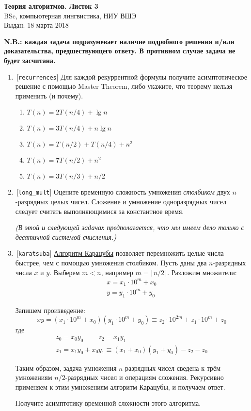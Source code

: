 \documentclass[12pt,a4paper]{report}
\begin{document}
\begin{center}
\textbf{\large{Теория алгоритмов. Листок 3}}\\
BSc, компьютерная лингвистика, НИУ ВШЭ\\
Выдан: 18 марта 2018\\
\end{center}

{\bf N.B.: каждая задача подразумевает наличие подробного решения и/или доказательства, предшествующего ответу. В противном случае задача не будет засчитана.}

\begin{enumerate}
  \item\,[{\tt recurrences}] Для каждой рекуррентной формулы получите асимптотическое решение с помощью Master Theorem, либо укажите, что теорему нельзя применить (и почему).

  \begin{enumerate}
    \item $T(n) = 2T(n/4) + \lg n$
    \item $T(n) = 3T(n/4) + n \lg n$
    \item $T(n) = T(n/2) + T(n/4) + n^2$
    \item $T(n) = 7T(n/2) + n^2$
    \item $T(n) = 3T(n/3) + n/2$
  \end{enumerate}

  \item\,[{\tt long\_mult}] Оцените временную сложность умножения {\em столбиком} двух $n$-разрядных целых чисел. Сложение и умножение одноразрядных чисел следует считать выполняющимися за константное время.

  {\em (В этой и следующей задачах предполагается, что мы имеем дело только с десятичной системой счисления.)}

  \item\,[{\tt karatsuba}] \href{https://en.wikipedia.org/wiki/Karatsuba_algorithm}{Алгоритм Карацубы} позволяет перемножить целые числа быстрее, чем с помощью умножения столбиком. Пусть даны два $n$-разрядных числа $x$ и $y$. Выберем $m<n$, например $m = \lceil n/2 \rceil$. Разложим множители:
  $$
  \begin{gathered}
  x = x_1 \cdot 10^m + x_0\\
  y = y_1 \cdot 10^m + y_0
  \end{gathered}
  $$

  Запишем произведение:
  $$
  \boxed{xy} = (x_1 \cdot 10^m + x_0)(y_1 \cdot 10^m + y_0)
       \equiv \boxed{z_2 \cdot 10^{2m} + z_1 \cdot 10^{m} + z_0}
  $$%
  где%
  $$
  \begin{gathered}
  z_0 = x_0 y_0   ~~~~~~~~~~  z_2 = x_1 y_1\\
  z_1 = x_1 y_0 + x_0 y_1 \equiv (x_1 + x_0)(y_1 + y_0) - z_2 - z_0
  \end{gathered}
  $$%

  Таким образом, задача умножения $n$-разрядных чисел сведена к трём умножениям $n/2$-разрядных чисел и операциям сложения. Рекурсивно применяем к этим умножениям алгоритм Карацубы, и получаем ответ.

  Получите асимптотику временной сложности этого алгоритма.
\end{enumerate}
\end{document}
